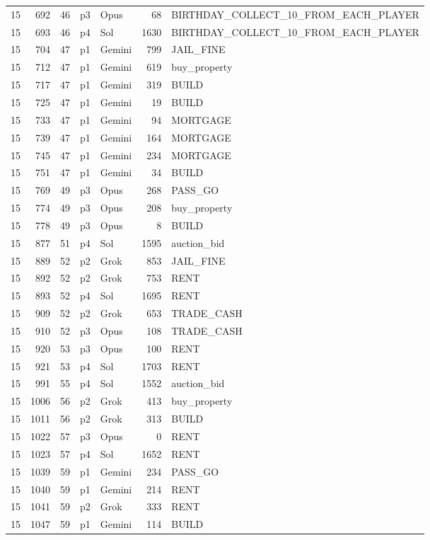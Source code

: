 \begin{longtable}{r r r l l r L{2.2in}}
15 & 692 & 46 & p3 & Opus & 68 & BIRTHDAY\_COLLECT\_10\_FROM\_EACH\_PLAYER \\
15 & 693 & 46 & p4 & Sol & 1630 & BIRTHDAY\_COLLECT\_10\_FROM\_EACH\_PLAYER \\
15 & 704 & 47 & p1 & Gemini & 799 & JAIL\_FINE \\
15 & 712 & 47 & p1 & Gemini & 619 & buy\_property \\
15 & 717 & 47 & p1 & Gemini & 319 & BUILD \\
15 & 725 & 47 & p1 & Gemini & 19 & BUILD \\
15 & 733 & 47 & p1 & Gemini & 94 & MORTGAGE \\
15 & 739 & 47 & p1 & Gemini & 164 & MORTGAGE \\
15 & 745 & 47 & p1 & Gemini & 234 & MORTGAGE \\
15 & 751 & 47 & p1 & Gemini & 34 & BUILD \\
15 & 769 & 49 & p3 & Opus & 268 & PASS\_GO \\
15 & 774 & 49 & p3 & Opus & 208 & buy\_property \\
15 & 778 & 49 & p3 & Opus & 8 & BUILD \\
15 & 877 & 51 & p4 & Sol & 1595 & auction\_bid \\
15 & 889 & 52 & p2 & Grok & 853 & JAIL\_FINE \\
15 & 892 & 52 & p2 & Grok & 753 & RENT \\
15 & 893 & 52 & p4 & Sol & 1695 & RENT \\
15 & 909 & 52 & p2 & Grok & 653 & TRADE\_CASH \\
15 & 910 & 52 & p3 & Opus & 108 & TRADE\_CASH \\
15 & 920 & 53 & p3 & Opus & 100 & RENT \\
15 & 921 & 53 & p4 & Sol & 1703 & RENT \\
15 & 991 & 55 & p4 & Sol & 1552 & auction\_bid \\
15 & 1006 & 56 & p2 & Grok & 413 & buy\_property \\
15 & 1011 & 56 & p2 & Grok & 313 & BUILD \\
15 & 1022 & 57 & p3 & Opus & 0 & RENT \\
15 & 1023 & 57 & p4 & Sol & 1652 & RENT \\
15 & 1039 & 59 & p1 & Gemini & 234 & PASS\_GO \\
15 & 1040 & 59 & p1 & Gemini & 214 & RENT \\
15 & 1041 & 59 & p2 & Grok & 333 & RENT \\
15 & 1047 & 59 & p1 & Gemini & 114 & BUILD \\

\end{longtable}
